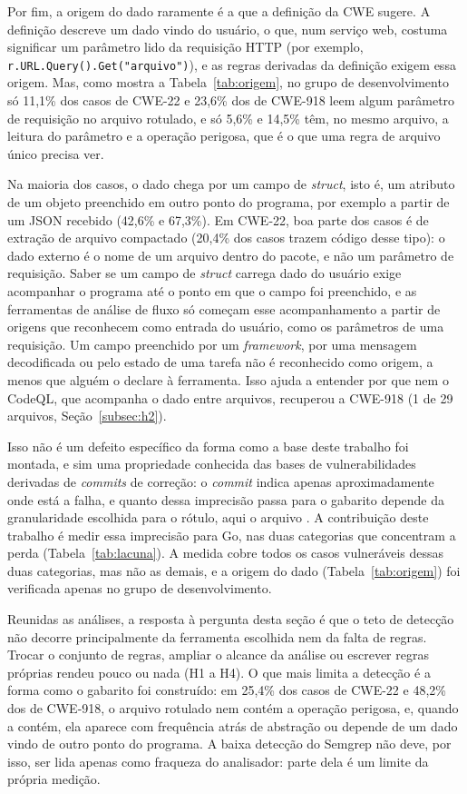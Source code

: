 Por fim, a origem do dado raramente é a que a definição da CWE sugere. A definição descreve um dado vindo do usuário, o que, num serviço web, costuma significar um parâmetro lido da requisição HTTP (por exemplo, \texttt{r.URL.Query().Get("arquivo")}), e as regras derivadas da definição exigem essa origem. Mas, como mostra a Tabela~\ref{tab:origem}, no grupo de desenvolvimento só 11,1\% dos casos de CWE-22 e 23,6\% dos de CWE-918 leem algum parâmetro de requisição no arquivo rotulado, e só 5,6\% e 14,5\% têm, no mesmo arquivo, a leitura do parâmetro e a operação perigosa, que é o que uma regra de arquivo único precisa ver.

Na maioria dos casos, o dado chega por um campo de \textit{struct}, isto é, um atributo de um objeto preenchido em outro ponto do programa, por exemplo a partir de um JSON recebido (42,6\% e 67,3\%). Em CWE-22, boa parte dos casos é de extração de arquivo compactado (20,4\% dos casos trazem código desse tipo): o dado externo é o nome de um arquivo dentro do pacote, e não um parâmetro de requisição. Saber se um campo de \textit{struct} carrega dado do usuário exige acompanhar o programa até o ponto em que o campo foi preenchido, e as ferramentas de análise de fluxo só começam esse acompanhamento a partir de origens que reconhecem como entrada do usuário, como os parâmetros de uma requisição. Um campo preenchido por um \textit{framework}, por uma mensagem decodificada ou pelo estado de uma tarefa não é reconhecido como origem, a menos que alguém o declare à ferramenta. Isso ajuda a entender por que nem o CodeQL, que acompanha o dado entre arquivos, recuperou a CWE-918 (1 de 29 arquivos, Seção~\ref{subsec:h2}).

{\sloppy Isso não é um defeito específico da forma como a base deste trabalho foi montada, e sim uma propriedade conhecida das bases de vulnerabilidades derivadas de \textit{commits} de correção: o \textit{commit} indica apenas aproximadamente onde está a falha, e quanto dessa imprecisão passa para o gabarito depende da granularidade escolhida para o rótulo, aqui o arquivo \cite{croft2023dataquality, bhandari2021cvefixes}. A contribuição deste trabalho é medir essa imprecisão para Go, nas duas categorias que concentram a perda (Tabela~\ref{tab:lacuna}). A medida cobre todos os casos vulneráveis dessas duas categorias, mas não as demais, e a origem do dado (Tabela~\ref{tab:origem}) foi verificada apenas no grupo de desenvolvimento.\par}

Reunidas as análises, a resposta à pergunta desta seção é que o teto de detecção não decorre principalmente da ferramenta escolhida nem da falta de regras. Trocar o conjunto de regras, ampliar o alcance da análise ou escrever regras próprias rendeu pouco ou nada (H1 a H4). O que mais limita a detecção é a forma como o gabarito foi construído: em 25,4\% dos casos de CWE-22 e 48,2\% dos de CWE-918, o arquivo rotulado nem contém a operação perigosa, e, quando a contém, ela aparece com frequência atrás de abstração ou depende de um dado vindo de outro ponto do programa. A baixa detecção do Semgrep não deve, por isso, ser lida apenas como fraqueza do analisador: parte dela é um limite da própria medição.

